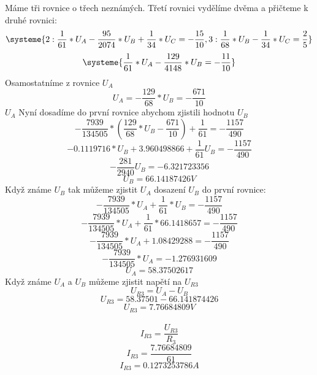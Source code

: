 \documentclass[11pt]{article}
\begin{document}
Máme tři rovnice o třech neznámých. Třetí rovnici vydělíme dvěma a přičteme k druhé rovnici:
\begin{equation*}
  \systeme{
  2: \frac{1}{61} *U_A - \frac{95}{2074}*U_B + \frac{1}{34}*U_C = -\frac{15}{10},
  3: \frac{1}{68} *U_B - \frac{1}{34}*U_C = \frac{2}{5}
  }
\end{equation*}
\begin{equation*}
  \systeme{
  \frac{1}{61}*U_A - \frac{129}{4148}*U_B = -\frac{11}{10}
  }
\end{equation*}
Osamostatníme z rovnice $U_A$
$$U_A = -\frac{129}{68}*U_B = -\frac{671}{10}$$
$U_A$ Nyní dosadíme do první rovnice abychom zjistili hodnotu $U_B$
$$-\frac{7939}{134505}*(\frac{129}{68}*U_B - \frac{671}{10}) + \frac{1}{61} = -\frac{1157}{490}$$
$$-0.1119716*U_B + 3.960498866 + \frac{1}{61}U_B = -\frac{1157}{490}$$
$$-\frac{281}{2940}U_B = -6.321723356$$
$$U_B = 66.14187426V$$
Když známe $U_B$ tak můžeme zjistit $U_A$ dosazení $U_B$ do první rovnice:
$$-\frac{7939}{134505}*U_A + \frac{1}{61}*U_B = -\frac{1157}{490}$$
$$-\frac{7939}{134505}*U_A + \frac{1}{61}*66.1418657 = -\frac{1157}{490}$$
$$-\frac{7939}{134505}*U_A + 1.08429288 = -\frac{1157}{490}$$
$$-\frac{7939}{134505}*U_A = -1.276931609$$
$$U_A = 58.37502617$$
Když známe $U_A$ a $U_B$ můžeme zjistit napětí na $U_{R3}$
$$U_{R3} = U_A - U_B$$
$$U_{R3} = 58.37501 - 66.141874426$$
$$U_{R3} = 7.76684809V$$\\
$$I_{R3} = \frac{U_{R3}}{R_3}$$
$$I_{R3} = \frac{7.76684809}{61}$$
$$I_{R3} = 0.1273253786A$$
\end{document}
